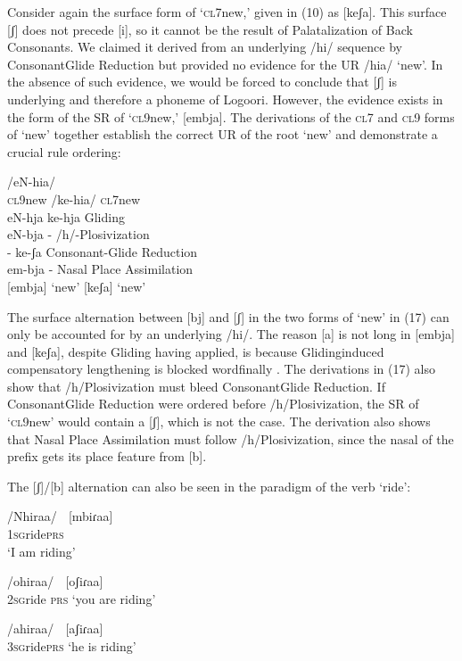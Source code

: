 \documentclass[output=paper]{langsci/langscibook}
\begin{document}
Consider again the surface form of ‘\textsc{cl}7new,’ given in (10) as [keʃa]. This surface [ʃ] does not precede [i], so it cannot be the result of Palatalization of Back Consonants. We claimed it derived from an underlying /hi/ sequence by ConsonantGlide Reduction but provided no evidence for the UR /hia/ ‘new’. In the absence of such evidence, we would be forced to conclude that [ʃ] is underlying and therefore a phoneme of Logoori. However, the evidence exists in the form of the SR of ‘\textsc{cl}9new,’ [embja]. The derivations of the \textsc{cl}7 and \textsc{cl}9 forms of ‘new’ together establish the correct UR of the root ‘new’ and demonstrate a crucial rule ordering:


\ea{}
/eN-hia/ \\{}
 \textsc{cl9}new  /ke-hia/  \textsc{cl7}new\\{}
eN-hja      ke-hja        Gliding\\{}
eN-bja      {}-        /h/-Plosivization\\{}
{}-        ke-ʃa        Consonant-Glide Reduction\\{}
em-bja      {}-        Nasal Place Assimilation\\{}
[embja]  ‘new’    [keʃa]     ‘new’
\z


The surface alternation between [bj] and [ʃ] in the two forms of ‘new’ in (17) can only be accounted for by an underlying /hi/. The reason [a] is not long in [embja] and [keʃa], despite Gliding having applied, is because Glidinginduced compensatory lengthening is blocked wordfinally \citep{Leung1991}. The derivations in (17) also show that /h/Plosivization must bleed ConsonantGlide Reduction. If ConsonantGlide Reduction were ordered before /h/Plosivization, the SR of ‘\textsc{cl}9new’ would contain a [ʃ], which is not the case. The derivation also shows that Nasal Place Assimilation must follow /h/Plosivization, since the nasal of the prefix gets its place feature from [b].

The [ʃ]/[b] alternation can also be seen in the paradigm of the verb ‘ride’:


\ea{}
 /Nhiraa/    [mbiɾaa]\\{}
\textsc{1sg}ride\textsc{prs}\\{}
\glt ‘I am riding’
\z

\ea{}
 /ohiraa/    \textsc{[}oʃiɾaa]\\{}
\textsc{2sg}ride \textsc{prs}
\glt ‘you are riding’
\z  


\ea{}
 /ahiraa/    [aʃiɾaa]  \\{}
\textsc{3sg}ride\textsc{prs}
\glt ‘he is riding’
\z
\end{document}

